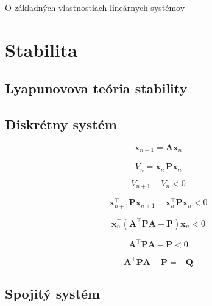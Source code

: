\documentclass[a4paper, 10pt, ]{article}
\begin{document}
\begin{flushleft}
    O základných vlastnostiach lineárnych systémov
\end{flushleft}

\bigskip

\normalsize
\normalfont


\section{Stabilita}
\subsection{Lyapunovova teória stability}


\subsection{Diskrétny systém}

\begin{equation}
    \bm{x}_{n + 1} = \bm{A} \bm{x}_{n}
\end{equation}

\begin{equation}
    V_{n} = \bm{x}_{n}^\top \bm{P} \bm{x}_{n}
\end{equation}

\begin{equation}
    V_{n + 1} - V_{n} < 0
\end{equation}

\begin{equation}
    \bm{x}_{n + 1}^\top \bm{P} \bm{x}_{n + 1} - \bm{x}_{n}^\top \bm{P} \bm{x}_{n} < 0
\end{equation}

\begin{equation}
    \bm{x}_{n}^\top \left( \bm{A}^\top \bm{P} \bm{A} - \bm{P} \right) \bm{x}_{n} < 0
\end{equation}

\begin{equation}
    \bm{A}^\top \bm{P} \bm{A} - \bm{P} < 0
\end{equation}

\begin{equation}
    \bm{A}^\top \bm{P} \bm{A} - \bm{P} = -\bm{Q}
\end{equation}


\subsection{Spojitý systém}
\end{document}
